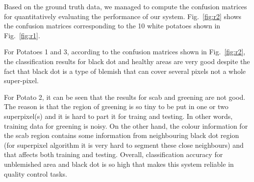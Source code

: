 \documentclass[twocolumn]{svjour3}          %
\begin{document}
Based on the ground truth data, we managed to compute the confusion matrices for quantitatively evaluating the performance of our system. Fig.~\ref{fig:r2} shows the confusion matrices corresponding to the 10 white potatoes shown in Fig.~\ref{fig:r1}.

For Potatoes 1 and 3, according to the confusion matrices shown in Fig.~\ref{fig:r2}, the classification results for black dot and healthy areas are very good despite the fact that black dot is a type of blemish that can cover several pixels not a whole super-pixel.

For Potato 2, it can be seen that the results for scab and greening  are not good. The reason is that the region of greening is so tiny to be put in one or two superpixel(s) and it is hard to part it for traing and testing. In other words,  training data for greening is noisy. On the other hand,  the colour information for the scab region contains  some information from neighbouring black dot region (for superpixel algorithm it is very hard to segment these close neighbours) and that affects both training and testing. Overall, classification accuracy for unblemished area and black dot is so high that makes this system reliable in quality control tasks.
\end{document}

